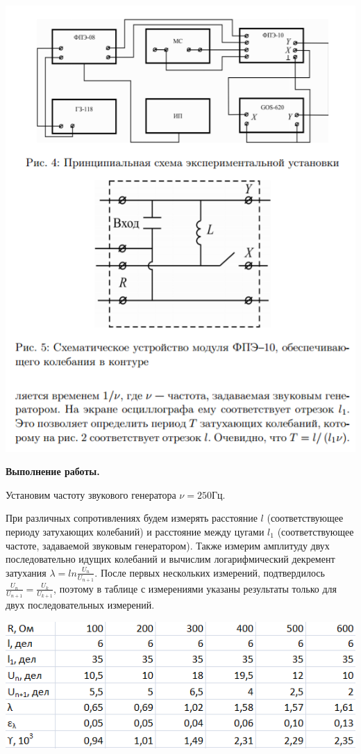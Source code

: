\documentclass[12pt]{article}
\begin{document}
\begin{center}
	    \includegraphics[width=15cm]{theory8.png}
    \end{center}
    
    \begin{center}
    	\textbf{\large Выполнение работы.}
    \end{center}
    
    Установим частоту звукового генератора $\nu = 250 Гц$.
    
    При различных сопротивлениях будем измерять расстояние $l$ (соответствующее периоду затухающих колебаний) и расстояние между цугами $l_1$ (соответствующее частоте, задаваемой звуковым генератором). Также измерим амплитуду двух последовательно идущих колебаний и вычислим логарифмический декремент затухания $\lambda = ln\frac{U_n}{U_{n+1}}$. После первых нескольких измерений, подтвердилось $\frac{U_n}{U_{n+1}} = \frac{U_k}{U_{k+1}}$, поэтому в таблице с измерениями указаны результаты только для двух последовательных измерений.
    
    \begin{center}
    	\includegraphics[width=15cm]{table1.png}
    \end{center}
    
\end{document}
